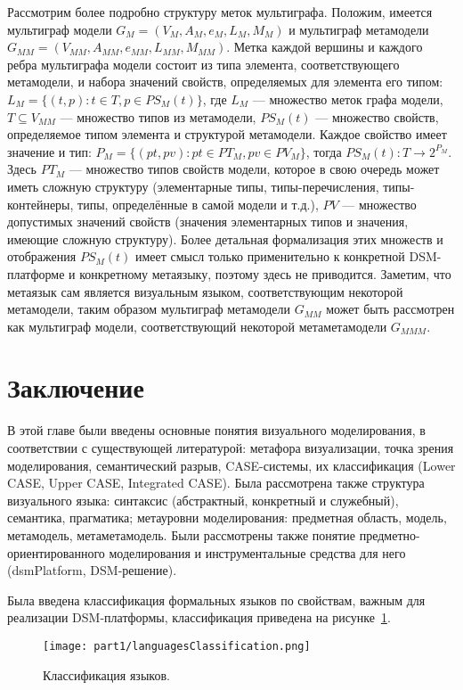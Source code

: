 Рассмотрим более подробно структуру меток мультиграфа. Положим, имеется мультиграф модели
$G_M = (V_M, A_M, e_M, L_M, M_M)$ и мультиграф метамодели $G_{MM} = (V_{MM}, A_{MM}, e_{MM}, L_{MM}, M_{MM})$.
Метка каждой вершины и каждого ребра мультиграфа модели состоит из типа элемента, соответствующего метамодели,
и набора значений свойств, определяемых для элемента его типом: $L_M = \{(t, p) : t \in T, p \in PS_M(t)\}$, 
где $L_M$ --- множество меток графа модели, $T \subseteq V_{MM}$ --- множество типов из метамодели,
$PS_M(t)$ --- множество свойств, определяемое типом элемента и структурой метамодели. 
Каждое свойство имеет значение и тип: $P_M = \{(pt, pv) : pt \in PT_M, pv \in PV_M\}$, тогда $PS_M(t): T \rightarrow 2^{P_M}$.
Здесь $PT_M$ --- множество типов свойств модели, которое в свою очередь может иметь сложную структуру
(элементарные типы, типы-перечисления, типы-контейнеры, типы, определённые в самой модели и т.д.),
$PV$ --- множество допустимых значений свойств (значения элементарных типов и значения,
имеющие сложную структуру). Более детальная формализация этих множеств и отображения $PS_M(t)$
имеет смысл только применительно к конкретной DSM-платформе и конкретному метаязыку,
поэтому здесь не приводится. Заметим, что метаязык сам является визуальным языком, 
соответствующим некоторой метамодели, таким образом мультиграф метамодели $G_{MM}$ может
быть рассмотрен как мультиграф модели, соответствующий некоторой метаметамодели $G_{MMM}$.

\section{Заключение}
В этой главе были введены основные понятия визуального моделирования, в соответствии с существующей 
литературой: метафора визуализации, точка зрения моделирования, семантический разрыв,
\ac{CASE}-системы, их классификация (Lower CASE, Upper CASE, Integrated CASE). Была рассмотрена
также структура визуального языка: синтаксис (абстрактный, конкретный и служебный),
семантика, прагматика; метауровни моделирования: предметная область, модель, метамодель,
метаметамодель. Были рассмотрены также понятие предметно-ориентированного моделирования
и инструментальные средства для него (\ac{dsmPlatform}, \ac{DSM}-решение).

Была введена классификация формальных языков по свойствам, важным для реализации \ac{DSM}-платформы, 
классификация приведена на рисунке~\ref{image:languagesClassification}.

\begin{figure} [ht]
	\begin{center}
		\texttt{[image: part1/languagesClassification.png]}
		\caption{Классификация языков.}
		\label{image:languagesClassification}
	\end{center}
\end{figure}

